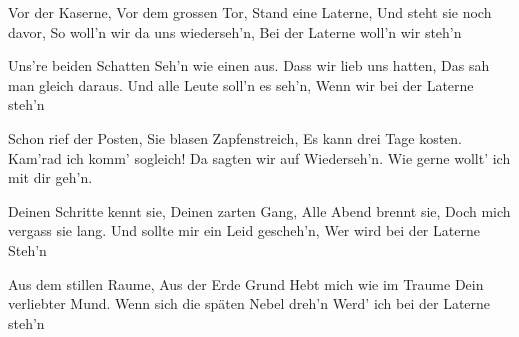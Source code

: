\footnotemark [
ititle={Lili Marleen}]


\beginverse
Vor der Kaserne,
Vor dem grossen Tor,
Stand eine Laterne,
Und steht sie noch davor,
So woll'n wir da uns wiederseh'n,
Bei der Laterne woll'n wir steh'n
\endverse

\beginverse
Uns're beiden Schatten
Seh'n wie einen aus.
Dass wir lieb uns hatten,
Das sah man gleich daraus.
Und alle Leute soll'n es seh'n,
Wenn wir bei der Laterne steh'n
\endverse

\beginverse
Schon rief der Posten,
Sie blasen Zapfenstreich,
Es kann drei Tage kosten.
Kam'rad ich komm' sogleich!
Da sagten wir auf Wiederseh'n.
Wie gerne wollt' ich mit dir geh'n.
\endverse

\beginverse
Deinen Schritte kennt sie,
Deinen zarten Gang,
Alle Abend brennt sie,
Doch mich vergass sie lang.
Und sollte mir ein Leid gescheh'n,
Wer wird bei der Laterne Steh'n
\endverse

\beginverse
Aus dem stillen Raume,
Aus der Erde Grund 
Hebt mich wie im Traume
Dein verliebter Mund.
Wenn sich die späten Nebel dreh'n
Werd' ich bei der Laterne steh'n
\endverse
\endsong